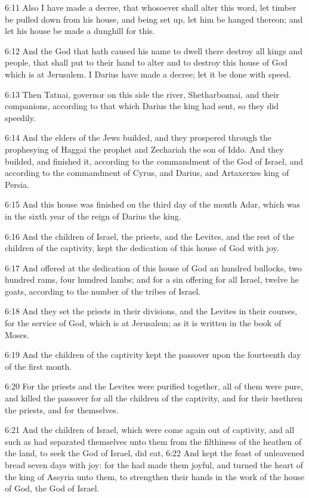 6:11 Also I have made a decree, that whosoever shall alter this word, let timber be pulled down from his house, and being set up, let him be hanged thereon; and let his house be made a dunghill for this.

6:12 And the God that hath caused his name to dwell there destroy all kings and people, that shall put to their hand to alter and to destroy this house of God which is at Jerusalem. I Darius have made a decree; let it be done with speed.

6:13 Then Tatnai, governor on this side the river, Shetharboznai, and their companions, according to that which Darius the king had sent, so they did speedily.

6:14 And the elders of the Jews builded, and they prospered through the prophesying of Haggai the prophet and Zechariah the son of Iddo.  And they builded, and finished it, according to the commandment of the God of Israel, and according to the commandment of Cyrus, and Darius, and Artaxerxes king of Persia.

6:15 And this house was finished on the third day of the month Adar, which was in the sixth year of the reign of Darius the king.

6:16 And the children of Israel, the priests, and the Levites, and the rest of the children of the captivity, kept the dedication of this house of God with joy.

6:17 And offered at the dedication of this house of God an hundred bullocks, two hundred rams, four hundred lambs; and for a sin offering for all Israel, twelve he goats, according to the number of the tribes of Israel.

6:18 And they set the priests in their divisions, and the Levites in their courses, for the service of God, which is at Jerusalem; as it is written in the book of Moses.

6:19 And the children of the captivity kept the passover upon the fourteenth day of the first month.

6:20 For the priests and the Levites were purified together, all of them were pure, and killed the passover for all the children of the captivity, and for their brethren the priests, and for themselves.

6:21 And the children of Israel, which were come again out of captivity, and all such as had separated themselves unto them from the filthiness of the heathen of the land, to seek the \LORD God of Israel, did eat, 6:22 And kept the feast of unleavened bread seven days with joy: for the \LORD had made them joyful, and turned the heart of the king of Assyria unto them, to strengthen their hands in the work of the house of God, the God of Israel.


